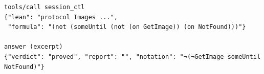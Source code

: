 \begin{lstlisting}[language={},basicstyle=\ttfamily\footnotesize,breaklines=true]
tools/call session_ctl
{"lean": "protocol Images ...",
 "formula": "(not (someUntil (not (on GetImage)) (on NotFound)))"}

answer (excerpt)
{"verdict": "proved", "report": "", "notation": "¬(¬GetImage someUntil NotFound)"}
\end{lstlisting}
